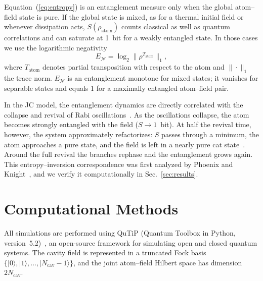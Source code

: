 \documentclass{iopjournal}
\begin{document}
Equation~(\ref{eq:entropy}) is an entanglement measure only when the global atom--field state is pure. If the global state is mixed, as for a thermal initial field or whenever dissipation acts, $S(\rho_{\text{atom}})$ counts classical as well as quantum correlations and can saturate at 1~bit for a weakly entangled state. In those cases we use the logarithmic negativity~\cite{vidal2002, plenio2005}
\begin{equation}
E_{\mathcal{N}} = \log_2 \big\| \rho^{T_{\text{atom}}} \big\|_1,
\label{eq:logneg}
\end{equation}
where $T_{\text{atom}}$ denotes partial transposition with respect to the atom and $\|\cdot\|_1$ the trace norm. $E_{\mathcal{N}}$ is an entanglement monotone for mixed states; it vanishes for separable states and equals 1 for a maximally entangled atom--field pair.

In the JC model, the entanglement dynamics are directly correlated with the collapse and revival of Rabi oscillations~\cite{phoenix1988}. As the oscillations collapse, the atom becomes strongly entangled with the field ($S \to 1$~bit). At half the revival time, however, the system approximately refactorizes: $S$ passes through a minimum, the atom approaches a pure state, and the field is left in a nearly pure cat state~\cite{gea-banacloche1990, phoenix1991}. Around the full revival the branches rephase and the entanglement grows again. This entropy--inversion correspondence was first analyzed by Phoenix and Knight~\cite{phoenix1988, phoenix1991}, and we verify it computationally in Sec.~\ref{sec:results}.


\section{Computational Methods}
\label{sec:methods}

All simulations are performed using QuTiP (Quantum Toolbox in Python, version~5.2)~\cite{johansson2012, johansson2013}, an open-source framework for simulating open and closed quantum systems. The cavity field is represented in a truncated Fock basis $\{|0\rangle, |1\rangle, \ldots, |N_{\text{cav}}-1\rangle\}$, and the joint atom--field Hilbert space has dimension $2N_{\text{cav}}$.
\end{document}
